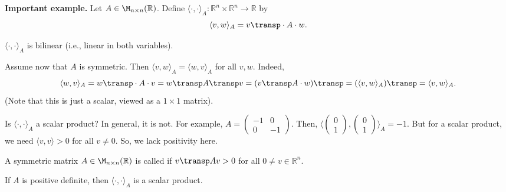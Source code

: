 \noindent\textbf{Important example.} Let $A \in \M_{n \times n}(\mathbb{R})$. Define $\langle \cdot, \cdot \rangle_A : \mathbb{R}^n \times \mathbb{R}^n \to \mathbb{R}$ by
\[
    \langle v, w \rangle_A = v\transp \cdot A \cdot w.
\]

\begin{exercise}
    \label{exc:bilinear_form_A}
    $\langle \cdot, \cdot \rangle_A$ is bilinear (i.e., linear in both variables).
\end{exercise}

Assume now that $A$ is symmetric. Then $\langle v, w \rangle_A = \langle w, v \rangle_A$ for all $v, w$. Indeed,
\[
    \langle w, v \rangle_A = w\transp \cdot A \cdot v = w\transp A\transp v = (v\transp A \cdot w)\transp = (\langle v, w \rangle_A)\transp = \langle v, w \rangle_A.
\]
(Note that this is just a scalar, viewed as a $1 \times 1$ matrix). 

Is $\langle \cdot, \cdot \rangle_A$ a scalar product? In general, it is not. For example, $A = \left(\begin{smallmatrix} -1 & 0 \\ 0 & -1 \end{smallmatrix}\right)$. Then, $\langle \left(\begin{smallmatrix} 0 \\ 1 \end{smallmatrix}\right), \left(\begin{smallmatrix} 0 \\ 1 \end{smallmatrix}\right) \rangle_A = -1$. But for a scalar product, we need $\langle v, v \rangle > 0$ for all $v \neq 0$. So, we lack positivity here.

\begin{definition}
\label{def:positive_definite_matrix_real}
    A symmetric matrix $A \in \M_{n \times n}(\mathbb{R})$ is called  if $v\transp A v > 0$ for all $0 \neq v \in \mathbb{R}^n$.
\end{definition}

\begin{exercise}
    \label{exc:pos_def_gives_scalar_product}
    If $A$ is positive definite, then $\langle \cdot, \cdot \rangle_A$ is a scalar product.
\end{exercise}

